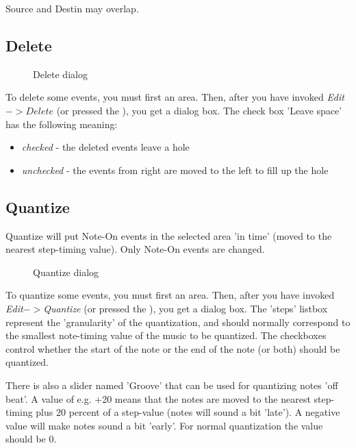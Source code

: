 \documentclass[letterpaper]{report}
\begin{document}
Source and Destin may overlap.



\subsection{Delete}\label{delete}

\begin{figure}%
%
%
\caption{Delete dialog}%
\end{figure}

To delete some events, you must first  an area.
Then, after you have invoked {\em Edit$->Delete$} (or pressed the
), you get a
dialog box. The check box 'Leave space' has the following meaning:

\begin{itemize}
\item {\em checked} - the deleted events leave a hole
\item {\em unchecked} - the events from right are moved to the left to
fill up the hole
\end{itemize}


\subsection{Quantize}\label{quantize}

Quantize will put Note-On events in the selected area 'in time' (moved to the
nearest step-timing value). Only Note-On events are changed.

\begin{figure}%
%
%
\caption{Quantize dialog}%
\end{figure}

To quantize some events, you must first  an area.
Then, after you have invoked {\em Edit$->$Quantize} (or pressed the
), you get a
dialog box. The 'steps' listbox represent the 'granularity' of the
quantization, and should normally correspond to the smallest note-timing
value of the music to be quantized. The checkboxes control whether the
start of the note or the end of the note (or both) should be quantized.

There is also a slider named 'Groove' that can be used for quantizing notes
'off beat'. A value of e.g. +20 means that the notes are moved to the nearest
step-timing plus 20 percent of a step-value (notes will sound a bit 'late'). A
negative value will make notes sound a bit 'early'. For normal quantization
the value should be 0.
\end{document}
